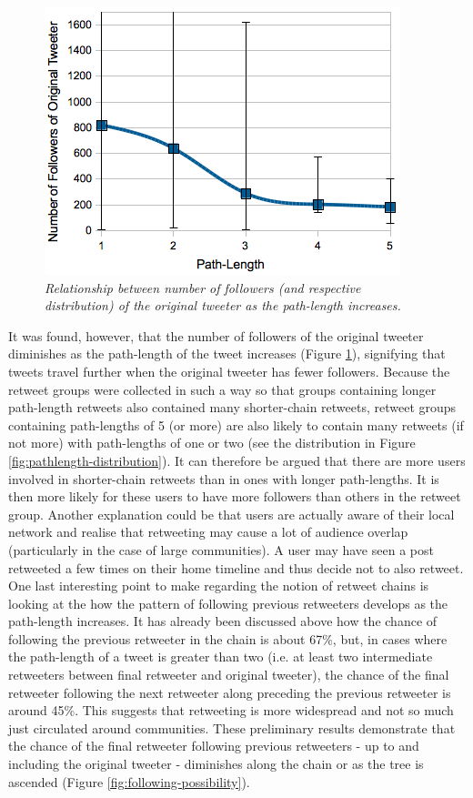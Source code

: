 \begin{figure}[h]
\includegraphics[scale=0.6]{3.Chapter1/Media/originalfollowers-pathlength-distribution.png} 
\caption{\textit{Relationship between number of followers (and respective distribution) of the original tweeter as the path-length increases.}}
\label{fig:originalfollowers-pathlength}
\end{figure}
It was found, however, that the number of followers of the original tweeter diminishes as the path-length of the tweet increases (Figure \ref{fig:originalfollowers-pathlength}), signifying that tweets travel further when the original tweeter has fewer followers. Because the retweet groups were collected in such a way so that groups containing longer path-length retweets also contained many shorter-chain retweets, retweet groups containing path-lengths of 5 (or more) are also likely to contain many retweets (if not more) with path-lengths of one or two (see the distribution in Figure \ref{fig:pathlength-distribution}). It can therefore be argued that there are more users involved in shorter-chain retweets than in ones with longer path-lengths. It is then more likely for these users to have more followers than others in the retweet group. Another explanation could be that users are actually aware of their local network and realise that retweeting may cause a lot of audience overlap (particularly in the case of large communities). A user may have seen a post retweeted a few times on their home timeline and thus decide not to also retweet.\\
One last interesting point to make regarding the notion of retweet chains is looking at the how the pattern of following previous retweeters develops as the path-length increases. It has already been discussed above how the chance of following the previous retweeter in the chain is about 67\%, but, in cases where the path-length of a tweet is greater than two (i.e. at least two intermediate retweeters between final retweeter and original tweeter), the chance of the final retweeter following the next retweeter along preceding the previous retweeter is around 45\%. This suggests that retweeting is more widespread and not so much just circulated around communities. These preliminary results demonstrate that the chance of the final retweeter following previous retweeters - up to and including the original tweeter - diminishes along the chain or as the tree is ascended (Figure \ref{fig:following-possibility}).\\
